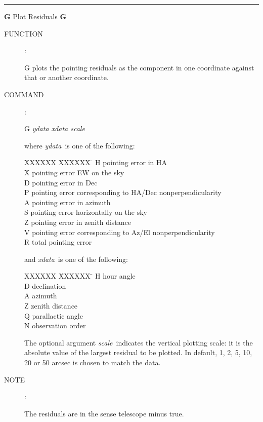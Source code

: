 \goodbreak
\rule{\textwidth}{0.3mm}
{\Large {\bf G} \hfill Plot Residuals \hfill {\bf G}}
\begin{description}
\item [FUNCTION]:

G plots the pointing residuals as the component in
one coordinate against that or another coordinate.

\item [COMMAND]:

\begin{cmd}
\> \> G {\it ydata xdata scale}
\end{cmd}

where {\it ydata}\, is one of the following:

\begin{tabs}
XXXXXX \= XXXXXX \= \kill
\> H \> pointing error in HA \\
\> X \> pointing error EW on the sky \\
\> D \> pointing error in Dec \\
\> P \> pointing error corresponding to HA/Dec nonperpendicularity \\
\> A \> pointing error in azimuth \\
\> S \> pointing error horizontally on the sky \\
\> Z \> pointing error in zenith distance \\
\> V \> pointing error corresponding to Az/El nonperpendicularity \\
\> R \> total pointing error
\end{tabs}

and {\it xdata}\, is one of the following:

\begin{tabs}
XXXXXX \= XXXXXX \= \kill
\> H \> hour angle \\
\> D \> declination \\
\> A \> azimuth \\
\> Z \> zenith distance \\
\> Q \> parallactic angle \\
\> N \> observation order
\end{tabs}

The optional argument {\it scale}\, indicates the vertical plotting
scale: it is the absolute value of the largest residual to be
plotted.  In default, 1, 2, 5, 10, 20 or 50 arcsec is chosen to match
the data.

\item [NOTE]:

The residuals are in the sense telescope minus true.

\end{description}

